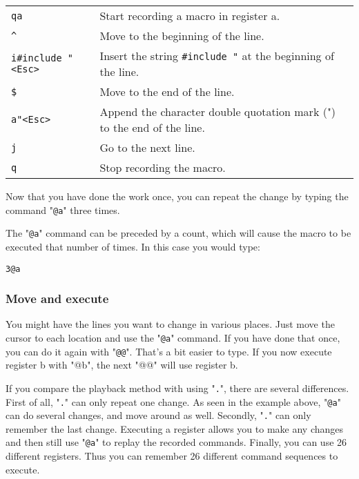 \begin{center}\begin{tabular}{l l}
				\texttt{qa} & Start recording a macro in register a.\\
				\texttt{\^{}} & Move to the beginning of the line.\\
				\texttt{i\#include "<Esc>} & Insert the string \texttt{\#include "} at the beginning of the line.\\
				\texttt{\$} & Move to the end of the line.\\
				\texttt{a"<Esc>} & Append the character double quotation mark (") to the end of the line.\\
				\texttt{j} & Go to the next line.\\
				\texttt{q} & Stop recording the macro.\\
\end{tabular}\end{center}

Now that you have done the work once, you can repeat the change by typing the command "\texttt{@a}" three times.

The "\texttt{@a}" command can be preceded by a count, which will cause the macro to be executed that number of times.
In this case you would type:

\begin{Verbatim}[samepage=true]
 3@a
\end{Verbatim}

\subsubsection{Move and execute}
You might have the lines you want to change in various places.
Just move the cursor to each location and use the "\texttt{@a}" command.
If you have done that once, you can do it again with "\texttt{@@}".
That's a bit easier to type.
If you now execute register b with "@b", the next "@@" will use register b.

If you compare the playback method with using "\texttt{.}", there are several differences.
First of all, "\texttt{.}" can only repeat one change.
As seen in the example above, "\texttt{@a}" can do several changes, and move around as well.
Secondly, "\texttt{.}" can only remember the last change.
Executing a register allows you to make any changes and then still use "\texttt{@a}" to replay the recorded commands.
Finally, you can use 26 different registers.
Thus you can remember 26 different command sequences to execute.


